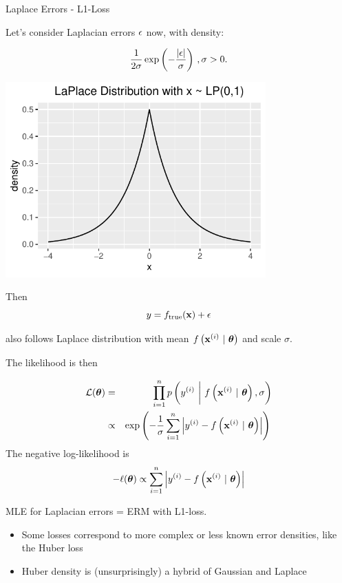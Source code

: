 \documentclass[11pt,compress,t,notes=noshow, xcolor=table]{beamer}
\begin{document}
\begin{vbframe}{Laplace Errors - L1-Loss}

Let's consider Laplacian errors $\epsilon$ now, with density: 

\begin{minipage}{0.5\textwidth}
$$
 \frac{1}{2\sigma} \exp\left(-\frac{|\epsilon|}{\sigma}\right)\,, \sigma > 0.
$$
\end{minipage}%
\begin{minipage}{0.5\textwidth}
\includegraphics[width = 0.75\textwidth]{figure/laplace_plot.pdf}
\end{minipage}
Then
$$
y = f_{\text{true}}(\mathbf{x}) + \epsilon 
$$

also follows Laplace distribution with mean $f\left(\mathbf{x}^{(i)} ~|~ \bm{\theta}\right)$ and scale  $\sigma$. 

\framebreak 

The likelihood is then 

\begin{eqnarray*}
\mathcal{L}(\bm{\theta}) &=& \prod_{i=1}^n p\left(y^{(i)} ~\bigg|~ f\left(\mathbf{x}^{(i)} ~|~ \bm{\theta}\right), \sigma\right) \\ &\propto& \exp\left(-\frac{1}{\sigma}\sum\limits_{i=1}^n \left|y^{(i)} - f\left(\mathbf{x}^{(i)} ~|~ \bm{\theta}\right)\right|\right)\,
\end{eqnarray*}
The negative log-likelihood is
$$
- \ell(\bm{\theta}) \propto \sum\limits_{i=1}^n \left|y^{(i)} - f\left(\mathbf{x}^{(i)} ~|~ \bm{\theta}\right)\right|
$$

MLE for Laplacian errors = ERM with L1-loss. 

\begin{itemize}
\item Some losses correspond to more complex or less known error densities, like the Huber loss 

\item Huber density is (unsurprisingly) a hybrid of Gaussian and Laplace

\end{itemize}


\end{vbframe}
\end{document}
